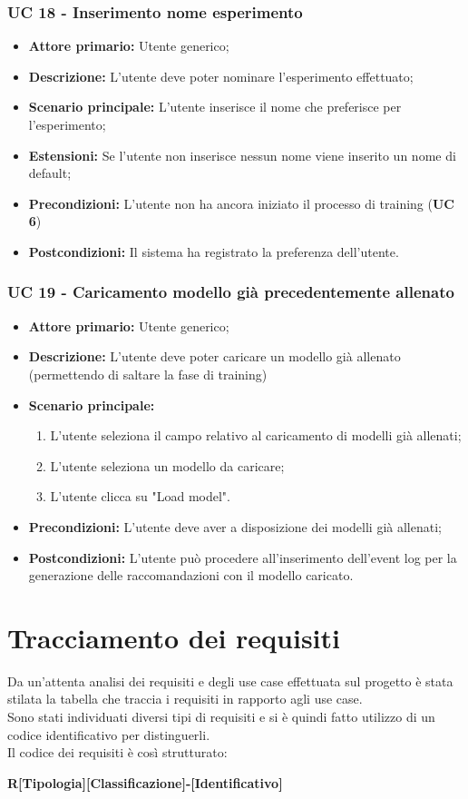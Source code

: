\subsubsection{UC 18 - Inserimento nome esperimento}
\begin{itemize}
	\item \textbf{Attore primario:} Utente generico;
	\item \textbf{Descrizione:} L'utente deve poter nominare l'esperimento effettuato;
	\item \textbf{Scenario principale:} L'utente inserisce il nome che preferisce per l'esperimento;
	\item \textbf{Estensioni:} Se l'utente non inserisce nessun nome viene inserito un nome di default; 
	\item \textbf{Precondizioni:} L'utente non ha ancora iniziato il processo di training (\textbf{UC 6})
	\item \textbf{Postcondizioni:} Il sistema ha registrato la preferenza dell'utente.
\end{itemize}

\subsubsection{UC 19 - Caricamento modello già precedentemente allenato}
\begin{itemize}
	\item \textbf{Attore primario:} Utente generico;
	\item \textbf{Descrizione:} L'utente deve poter caricare un modello già allenato (permettendo di saltare la fase di training)
	\item \textbf{Scenario principale:}
		\begin{enumerate}
			\item L'utente seleziona il campo relativo al caricamento di modelli già allenati;
			\item L'utente seleziona un modello da caricare;
			\item L'utente clicca su "Load model".
		\end{enumerate}
	\item \textbf{Precondizioni:} L'utente deve aver a disposizione dei modelli già allenati; 
	\item \textbf{Postcondizioni:} L'utente può procedere all'inserimento dell'event log per la generazione delle raccomandazioni con il modello caricato.
\end{itemize}

\clearpage
\section{Tracciamento dei requisiti}
Da un'attenta analisi dei requisiti e degli use case effettuata sul progetto è stata stilata la tabella che traccia i requisiti in rapporto agli use case. 
\\
Sono stati individuati diversi tipi di requisiti e si è quindi fatto utilizzo di un codice identificativo per distinguerli.
\\
Il codice dei requisiti è così strutturato: 
\\
\centerline{\textbf{R[Tipologia][Classificazione]-[Identificativo]}}

